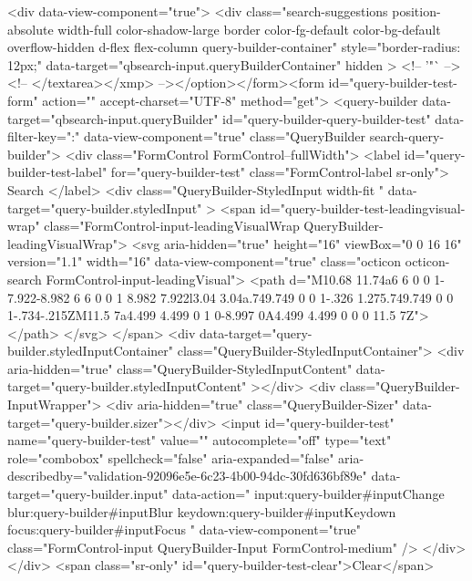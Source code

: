           <div data-view-component="true">        <div class="search-suggestions position-absolute width-full color-shadow-large border color-fg-default color-bg-default overflow-hidden d-flex flex-column query-builder-container"
          style="border-radius: 12px;"
          data-target="qbsearch-input.queryBuilderContainer"
          hidden
        >
          <!-- '"` --><!-- </textarea></xmp> --></option></form><form id="query-builder-test-form" action="" accept-charset="UTF-8" method="get">
  <query-builder data-target="qbsearch-input.queryBuilder" id="query-builder-query-builder-test" data-filter-key=":" data-view-component="true" class="QueryBuilder search-query-builder">
    <div class="FormControl FormControl--fullWidth">
      <label id="query-builder-test-label" for="query-builder-test" class="FormControl-label sr-only">
        Search
      </label>
      <div
        class="QueryBuilder-StyledInput width-fit "
        data-target="query-builder.styledInput"
      >
          <span id="query-builder-test-leadingvisual-wrap" class="FormControl-input-leadingVisualWrap QueryBuilder-leadingVisualWrap">
            <svg aria-hidden="true" height="16" viewBox="0 0 16 16" version="1.1" width="16" data-view-component="true" class="octicon octicon-search FormControl-input-leadingVisual">
    <path d="M10.68 11.74a6 6 0 0 1-7.922-8.982 6 6 0 0 1 8.982 7.922l3.04 3.04a.749.749 0 0 1-.326 1.275.749.749 0 0 1-.734-.215ZM11.5 7a4.499 4.499 0 1 0-8.997 0A4.499 4.499 0 0 0 11.5 7Z"></path>
</svg>
          </span>
        <div data-target="query-builder.styledInputContainer" class="QueryBuilder-StyledInputContainer">
          <div
            aria-hidden="true"
            class="QueryBuilder-StyledInputContent"
            data-target="query-builder.styledInputContent"
          ></div>
          <div class="QueryBuilder-InputWrapper">
            <div aria-hidden="true" class="QueryBuilder-Sizer" data-target="query-builder.sizer"></div>
            <input id="query-builder-test" name="query-builder-test" value="" autocomplete="off" type="text" role="combobox" spellcheck="false" aria-expanded="false" aria-describedby="validation-92096e5e-6c23-4b00-94dc-30fd636bf89e" data-target="query-builder.input" data-action="
          input:query-builder#inputChange
          blur:query-builder#inputBlur
          keydown:query-builder#inputKeydown
          focus:query-builder#inputFocus
        " data-view-component="true" class="FormControl-input QueryBuilder-Input FormControl-medium" />
          </div>
        </div>
          <span class="sr-only" id="query-builder-test-clear">Clear</span>
